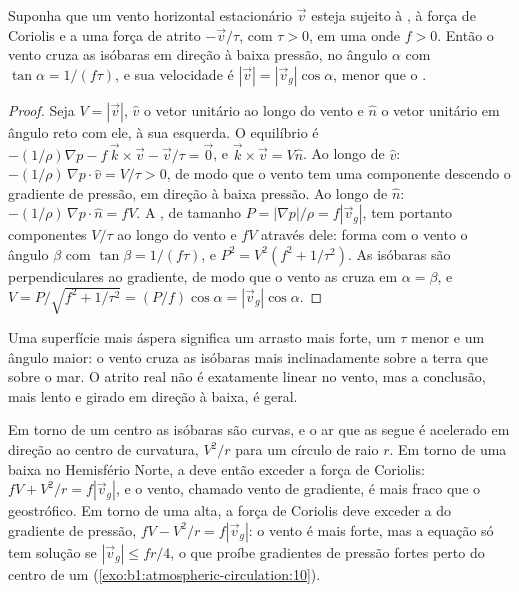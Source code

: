 \begin{proposition}\label{prop:b1:atmospheric-circulation:friction}
Suponha que um vento horizontal estacionário $\vec v$ esteja sujeito à ,
à força de Coriolis e a uma força de atrito $-\vec v/\tau$, com $\tau > 0$, em uma  onde
$f > 0$. Então o vento cruza as isóbaras em direção à baixa pressão, no ângulo $\alpha$ com
$\tan\alpha = 1/(f\tau)$, e sua velocidade é $|\vec v| =
|\vec v_g|\cos\alpha$, menor que o .
\end{proposition}

\begin{proof}
Seja $V = |\vec v|$, $\hat v$ o vetor unitário ao longo do vento e $\hat n$ o vetor unitário em
ângulo reto com ele, à sua esquerda. O equilíbrio é $-(1/\rho)\nabla p - f\,
\vec k\times\vec v - \vec v/\tau = \vec 0$, e $\vec k\times\vec v = V\hat n$. Ao longo de $\hat v$:
$-(1/\rho)\,\nabla p\cdot\hat v = V/\tau > 0$, de modo que o vento tem uma componente descendo o
gradiente de pressão, em direção à baixa pressão. Ao longo de $\hat n$: $-(1/\rho)\,\nabla p\cdot\hat n = fV$.
A , de tamanho $P =
|\nabla p|/\rho = f|\vec v_g|$, tem portanto componentes $V/\tau$ ao longo do vento e
$fV$ através dele: forma com o vento o ângulo $\beta$ com $\tan\beta =
1/(f\tau)$, e $P^2 = V^2(f^2 + 1/\tau^2)$. As isóbaras são perpendiculares ao
gradiente, de modo que o vento as cruza em $\alpha = \beta$, e $V = P/\sqrt{f^2 +
1/\tau^2} = (P/f)\cos\alpha = |\vec v_g|\cos\alpha$.
\end{proof}

Uma superfície mais áspera significa um arrasto mais forte, um $\tau$ menor e um ângulo maior: o
vento cruza as isóbaras mais inclinadamente sobre a terra que sobre o mar. O atrito real não é
exatamente linear no vento, mas a conclusão, mais lento e girado em direção à baixa, é geral.

\begin{remark}\label{rem:b1:atmospheric-circulation:gradient}
Em torno de um centro as isóbaras são curvas, e o ar que as segue é acelerado em direção ao centro
de curvatura, $V^2/r$ para um círculo de raio $r$. Em torno de uma baixa no Hemisfério Norte, a  deve então exceder a força de Coriolis: $fV + V^2/r = f|\vec v_g|$, e o vento,
chamado vento de gradiente, é mais fraco que o geostrófico. Em torno de uma alta, a força de Coriolis
deve exceder a do gradiente de pressão, $fV - V^2/r = f|\vec v_g|$: o vento é mais forte, mas a
equação só tem solução se $|\vec v_g| \leq fr/4$, o que proíbe gradientes de pressão fortes perto do
centro de um  (\cref{exo:b1:atmospheric-circulation:10}).
\end{remark}

